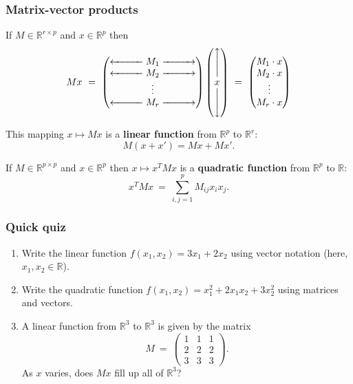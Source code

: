 \documentclass[smaller]{beamer}
\def\R{{\mathbb R}}
\def\darkred{\color{red!70!black}}
\def\darkgreen{\color{green!60!black}}
\def\v2{{\vskip.2in}}
\def\R{{\mathbb R}}
\begin{document}
\begin{frame}
\frametitle{Matrix-vector products}

If $M \in \R^{r \times p}$ and $x \in \R^p$ then
$$ Mx \ = \ 
\begin{pmatrix}
\xleftarrow{\hspace*{1cm}} M_1 \xrightarrow{\hspace*{1cm}} \\
\xleftarrow{\hspace*{1cm}} M_2 \xrightarrow{\hspace*{1cm}} \\
\vdots \\
\xleftarrow{\hspace*{1cm}} M_r \xrightarrow{\hspace*{1cm}} \\
\end{pmatrix}
\begin{pmatrix}
\Bigg\uparrow \\
x \\
\Bigg\downarrow
\end{pmatrix}
\ = \ 
\begin{pmatrix}
M_1 \cdot x \\
M_2 \cdot x \\
\vdots \\
M_r \cdot x
\end{pmatrix}
$$

\pause\v2
{\darkred This mapping $x \mapsto Mx$ is a {\bf linear function} from $\R^p$ to $\R^r$:
$$ M(x + x') = Mx + Mx' .$$}

\pause
{\darkgreen If $M \in \R^{p \times p}$ and $x \in \R^p$ then $x \mapsto x^T M x$ is a {\bf quadratic function} from $\R^p$ to $\R$:
$$ x^T M x \ = \ \sum_{i,j = 1}^p M_{ij} x_i x_j .$$}

\end{frame}

\begin{frame}
\frametitle{Quick quiz}

\begin{enumerate}
\item<1-> Write the linear function $f(x_1, x_2) = 3x_1 + 2x_2$ using vector notation (here, $x_1, x_2 \in \R$).
\item<2-> Write the quadratic function $f(x_1, x_2) = x_1^2 + 2x_1x_2 + 3 x_2^2$ using matrices and vectors.
\item<3-> A linear function from $\R^3$ to $\R^3$ is given by the matrix
$$ M \ = \ 
\begin{pmatrix}
1 & 1 & 1 \\
2 & 2 & 2 \\
3 & 3 & 3
\end{pmatrix}
.
$$
As $x$ varies, does $Mx$ fill up all of $\R^3$?

\end{enumerate}

\end{frame}
\end{document}
